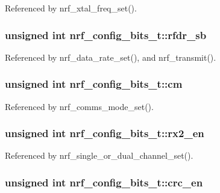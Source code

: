 Referenced by nrf\_\-xtal\_\-freq\_\-set().\hypertarget{structnrf__config__bits__t_69ed8edc0fd106984843c43b6c12ffa9}{
\subsubsection{\setlength{\rightskip}{0pt plus 5cm}unsigned int {\bf nrf\_\-config\_\-bits\_\-t::rfdr\_\-sb}}}
\label{structnrf__config__bits__t_69ed8edc0fd106984843c43b6c12ffa9}




Referenced by nrf\_\-data\_\-rate\_\-set(), and nrf\_\-transmit().\hypertarget{structnrf__config__bits__t_fad6dd3d6d8234e9ff1227d715ff2f6c}{
\subsubsection{\setlength{\rightskip}{0pt plus 5cm}unsigned int {\bf nrf\_\-config\_\-bits\_\-t::cm}}}
\label{structnrf__config__bits__t_fad6dd3d6d8234e9ff1227d715ff2f6c}




Referenced by nrf\_\-comms\_\-mode\_\-set().\hypertarget{structnrf__config__bits__t_3852d77b88b86fd1acd154baecb9a6c2}{
\subsubsection{\setlength{\rightskip}{0pt plus 5cm}unsigned int {\bf nrf\_\-config\_\-bits\_\-t::rx2\_\-en}}}
\label{structnrf__config__bits__t_3852d77b88b86fd1acd154baecb9a6c2}




Referenced by nrf\_\-single\_\-or\_\-dual\_\-channel\_\-set().\hypertarget{structnrf__config__bits__t_e871d44380a8993366cb72bbada57f86}{
\subsubsection{\setlength{\rightskip}{0pt plus 5cm}unsigned int {\bf nrf\_\-config\_\-bits\_\-t::crc\_\-en}}}
\label{structnrf__config__bits__t_e871d44380a8993366cb72bbada57f86}





